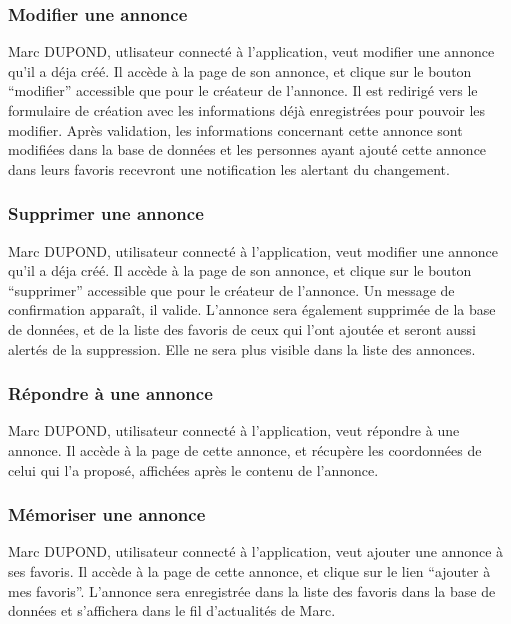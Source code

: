 \subsubsection*{Modifier une annonce}
Marc DUPOND, utlisateur connecté à l’application, veut modifier une annonce qu’il a déja créé. Il accède à la page de son annonce, et clique sur le bouton “modifier” accessible que pour le créateur de l’annonce. Il est redirigé vers le formulaire de création avec les informations déjà enregistrées pour pouvoir les modifier. Après validation, les informations concernant cette annonce sont modifiées dans la base de données et les personnes ayant ajouté cette annonce dans leurs favoris recevront une notification les alertant du changement.
\subsubsection*{Supprimer une annonce}
Marc DUPOND, utilisateur connecté à l’application, veut modifier une annonce qu’il a déja créé. Il accède à la page de son annonce, et clique sur le bouton “supprimer” accessible que pour le créateur de l’annonce. Un message de confirmation apparaît, il valide. L’annonce sera également supprimée de la base de données, et de la liste des favoris de ceux qui l’ont ajoutée et seront aussi alertés de la suppression. Elle ne sera plus visible dans la liste des annonces.
\subsubsection*{Répondre à une annonce}
Marc DUPOND, utilisateur connecté à l’application, veut répondre à une annonce. Il accède à la page de cette annonce, et récupère les coordonnées de celui qui l’a proposé, affichées après le contenu de l’annonce.
\subsubsection*{Mémoriser une annonce}
Marc DUPOND, utilisateur connecté à l’application, veut ajouter une annonce à ses favoris. Il accède à la page de cette annonce, et clique sur le lien “ajouter à mes favoris”. L’annonce sera enregistrée dans la liste des favoris dans la base de données et s’affichera dans le fil d’actualités de Marc.